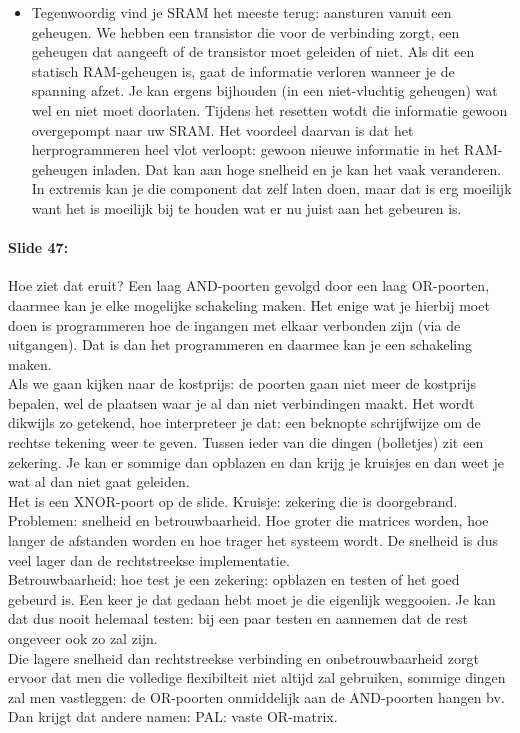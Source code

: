 \documentclass[10pt,a4paper]{book}
\begin{document}
\begin{itemize}
\item Tegenwoordig vind je SRAM het meeste terug: aansturen vanuit een geheugen. We hebben een transistor die voor de verbinding zorgt, een geheugen dat aangeeft of de transistor moet geleiden of niet. Als dit een statisch RAM-geheugen is, gaat de informatie verloren wanneer je de spanning afzet. Je kan ergens bijhouden (in een niet-vluchtig geheugen) wat wel en niet moet doorlaten. Tijdens het resetten wotdt die informatie gewoon overgepompt naar uw SRAM. Het voordeel daarvan is dat het herprogrammeren heel vlot verloopt: gewoon nieuwe informatie in het RAM-geheugen inladen. Dat kan aan hoge snelheid en je kan het vaak veranderen. In extremis kan je die component dat zelf laten doen, maar dat is erg moeilijk want het is moeilijk bij te houden wat er nu juist aan het gebeuren is.
\end{itemize}

\paragraph{Slide 47:} Hoe ziet dat eruit? Een laag AND-poorten gevolgd door een laag OR-poorten, daarmee kan je elke mogelijke schakeling maken. Het enige wat je hierbij moet doen is programmeren hoe de ingangen met elkaar verbonden zijn (via de uitgangen). Dat is dan het programmeren en daarmee kan je een schakeling maken. \\
Als we gaan kijken naar de kostprijs: de poorten gaan niet meer de kostprijs bepalen, wel de plaatsen waar je al dan niet verbindingen maakt. Het wordt dikwijls zo getekend, hoe interpreteer je dat: een beknopte schrijfwijze om de rechtse tekening weer te geven. Tussen ieder van die dingen (bolletjes) zit een zekering. Je kan er sommige dan opblazen en dan krijg je kruisjes en dan weet je wat al dan niet gaat geleiden.\\
Het is een XNOR-poort op de slide. Kruisje: zekering die is doorgebrand.\\
Problemen: snelheid en betrouwbaarheid. Hoe groter die matrices worden, hoe langer de afstanden worden en hoe trager het systeem wordt. De snelheid is dus veel lager dan de rechtstreekse implementatie.\\
Betrouwbaarheid: hoe test je een zekering: opblazen en testen of het goed gebeurd is. Een keer je dat gedaan hebt moet je die eigenlijk weggooien. Je kan dat dus nooit helemaal testen: bij een paar testen en aannemen dat de rest ongeveer ook zo zal zijn.\\
Die lagere snelheid dan rechtstreekse verbinding en onbetrouwbaarheid zorgt ervoor dat men die volledige flexibilteit niet altijd zal gebruiken, sommige dingen zal men vastleggen: de OR-poorten onmiddelijk aan de AND-poorten hangen bv.\\
Dan krijgt dat andere namen: PAL: vaste OR-matrix. 
\end{document}
